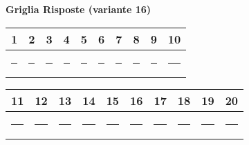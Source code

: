 \documentclass{exam}%
\newcounter{variant}%
\begin{document}
%
\normalsize%
\setcounter{variant}{16}%
\noindent \textbf{  }%
\bigskip%
\noindent\textbf{Griglia Risposte (variante 16)}%
\begin{center}
\begin{tabular}{|c|c|c|c|c|c|c|c|c|c|}
\hline
1 & 2 & 3 & 4 & 5 & 6 & 7 & 8 & 9 & 10 \\ \hline
\rule{1cm}{0pt}\rule[-0.5em]{0pt}{1.5em} & \rule{1cm}{0pt}\rule[-0.5em]{0pt}{1.5em} & \rule{1cm}{0pt}\rule[-0.5em]{0pt}{1.5em} & \rule{1cm}{0pt}\rule[-0.5em]{0pt}{1.5em} & \rule{1cm}{0pt}\rule[-0.5em]{0pt}{1.5em} & \rule{1cm}{0pt}\rule[-0.5em]{0pt}{1.5em} & \rule{1cm}{0pt}\rule[-0.5em]{0pt}{1.5em} & \rule{1cm}{0pt}\rule[-0.5em]{0pt}{1.5em} & \rule{1cm}{0pt}\rule[-0.5em]{0pt}{1.5em} & \rule{1cm}{0pt}\rule[-0.5em]{0pt}{1.5em} \\ \hline
\end{tabular}
\end{center}%
\vspace{0.3em}%
\begin{center}
\begin{tabular}{|c|c|c|c|c|c|c|c|c|c|}
\hline
11 & 12 & 13 & 14 & 15 & 16 & 17 & 18 & 19 & 20 \\ \hline
\rule{1cm}{0pt}\rule[-0.5em]{0pt}{1.5em} & \rule{1cm}{0pt}\rule[-0.5em]{0pt}{1.5em} & \rule{1cm}{0pt}\rule[-0.5em]{0pt}{1.5em} & \rule{1cm}{0pt}\rule[-0.5em]{0pt}{1.5em} & \rule{1cm}{0pt}\rule[-0.5em]{0pt}{1.5em} & \rule{1cm}{0pt}\rule[-0.5em]{0pt}{1.5em} & \rule{1cm}{0pt}\rule[-0.5em]{0pt}{1.5em} & \rule{1cm}{0pt}\rule[-0.5em]{0pt}{1.5em} & \rule{1cm}{0pt}\rule[-0.5em]{0pt}{1.5em} & \rule{1cm}{0pt}\rule[-0.5em]{0pt}{1.5em} \\ \hline
\end{tabular}
\end{center}%
\vspace{1em}%
\end{document}
